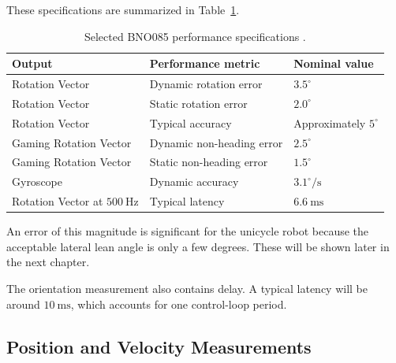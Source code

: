 These specifications are summarized in Table~\ref{tab:bno085-performance}.

\begin{table}[htbp]
  \centering
  \small
  \renewcommand{\arraystretch}{1.3}
  \caption{Selected BNO085 performance specifications \cite{bno08x_datasheet}.}
  \label{tab:bno085-performance}
  \begin{tabular}{
    p{}
    p{}
    p{}
  }
    \hline
    \textbf{Output}
    &
    \textbf{Performance metric}
    &
    \textbf{Nominal value}
    \\
    \hline

    Rotation Vector
    &
    Dynamic rotation error
    &
    $3.5^\circ$
    \\

    Rotation Vector
    &
    Static rotation error
    &
    $2.0^\circ$
    \\

    Rotation Vector
    &
    Typical accuracy
    &
    Approximately $5^\circ$
    \\

    Gaming Rotation Vector
    &
    Dynamic non-heading error
    &
    $2.5^\circ$
    \\

    Gaming Rotation Vector
    &
    Static non-heading error
    &
    $1.5^\circ$
    \\

    Gyroscope
    &
    Dynamic accuracy
    &
    $3.1^\circ/\mathrm{s}$
    \\

    Rotation Vector at $500~\mathrm{Hz}$
    &
    Typical latency
    &
    $6.6~\mathrm{ms}$
    \\

    \hline
  \end{tabular}
\end{table}


An error of this magnitude is significant for the unicycle robot because the acceptable lateral lean angle is only a few degrees. These will be shown later in the next chapter.

The orientation measurement also contains delay. A typical latency will be around $10~\mathrm{ms}$, which accounts for one control-loop period.

\subsection{Position and Velocity Measurements}

